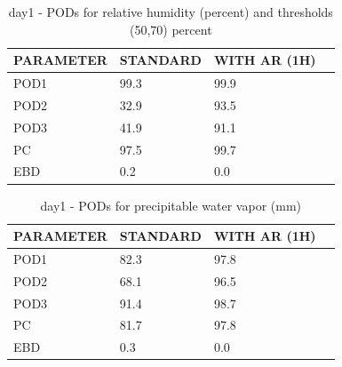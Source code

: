\begin{table}[p!]
\begin{center}
\begin{tabular}{|l|l|l|l|}
\hline
\multicolumn{1}{|c|}{\cellcolor[HTML]{C0C0C0}\textbf{PARAMETER}} & \multicolumn{1}{c|}{\cellcolor[HTML]{C0C0C0}\textbf{STANDARD}} & \multicolumn{1}{c|}{\cellcolor[HTML]{C0C0C0}\textbf{WITH AR (1H)}} \\
\hline
\cellcolor[HTML]{C0C0C0}POD1  & 99.3                                & 99.9         \\
\cellcolor[HTML]{C0C0C0}POD2  & 32.9                                & 93.5         \\
\cellcolor[HTML]{C0C0C0}POD3  & 41.9                                & 91.1         \\
\cellcolor[HTML]{C0C0C0}PC    & 97.5                                & 99.7           \\
\cellcolor[HTML]{C0C0C0}EBD   & 0.2                                & 0.0          \\
\hline
\end{tabular}
\caption{day1 - PODs for relative humidity (percent) and thresholds (50,70) percent}
\label{tab:podrhFT:day1}
\end{center}
\end{table}
\begin{table}[p!]
\begin{center}
\begin{tabular}{|l|l|l|l|}
\hline
\multicolumn{1}{|c|}{\cellcolor[HTML]{C0C0C0}\textbf{PARAMETER}} & \multicolumn{1}{c|}{\cellcolor[HTML]{C0C0C0}\textbf{STANDARD}} & \multicolumn{1}{c|}{\cellcolor[HTML]{C0C0C0}\textbf{WITH AR (1H)}} \\
\hline
\cellcolor[HTML]{C0C0C0}POD1  & 82.3                                & 97.8         \\
\cellcolor[HTML]{C0C0C0}POD2  & 68.1                                & 96.5         \\
\cellcolor[HTML]{C0C0C0}POD3  & 91.4                                & 98.7         \\
\cellcolor[HTML]{C0C0C0}PC    & 81.7                                  & 97.8           \\
\cellcolor[HTML]{C0C0C0}EBD   & 0.3                                 & 0.0          \\
\hline
\end{tabular}
\caption{day1 - PODs for precipitable water vapor (mm)}
\label{tab:podpwv:day1}
\end{center}
\end{table}
